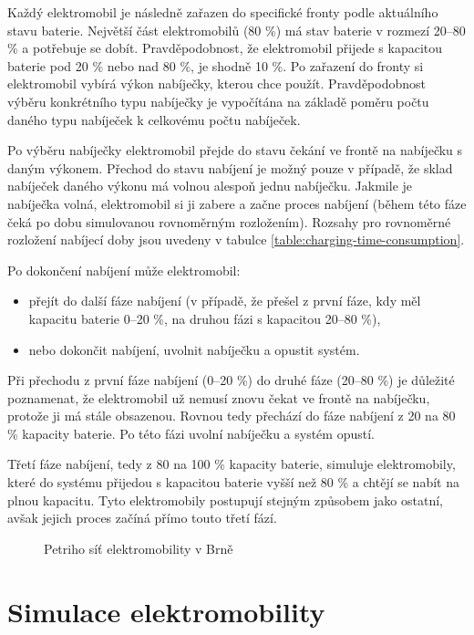 \documentclass[a4paper,11pt]{article}
\begin{document}
Každý elektromobil je následně zařazen do specifické fronty podle aktuálního stavu baterie. Největší část elektromobilů (80 \%) má stav baterie v rozmezí 20–80 \% a potřebuje se dobít. Pravděpodobnost, že elektromobil přijede s kapacitou baterie pod 20 \% nebo nad 80 \%, je shodně 10 \%. Po zařazení do fronty si elektromobil vybírá výkon nabíječky, kterou chce použít. Pravděpodobnost výběru konkrétního typu nabíječky je vypočítána na základě poměru počtu daného typu nabíječek k celkovému počtu nabíječek. 

Po výběru nabíječky elektromobil přejde do stavu čekání ve frontě na nabíječku s daným výkonem. Přechod do stavu nabíjení je možný pouze v případě, že sklad nabíječek daného výkonu má volnou alespoň jednu nabíječku. Jakmile je nabíječka volná, elektromobil si ji zabere a začne proces nabíjení (během této fáze čeká po dobu simulovanou rovnoměrným rozložením). Rozsahy pro rovnoměrné rozložení nabíjecí doby jsou uvedeny v tabulce \ref{table:charging-time-consumption}.


Po dokončení nabíjení může elektromobil:
\begin{itemize}
    \item přejít do další fáze nabíjení (v případě, že přešel z první fáze, kdy měl kapacitu baterie 0–20 \%, na druhou fázi s kapacitou 20–80 \%),
    \item nebo dokončit nabíjení, uvolnit nabíječku a opustit systém.
\end{itemize}

Při přechodu z první fáze nabíjení (0–20 \%) do druhé fáze (20–80 \%) je důležité poznamenat, že elektromobil už nemusí znovu čekat ve frontě na nabíječku, protože ji má stále obsazenou. Rovnou tedy přechází do fáze nabíjení z 20 na 80 \% kapacity baterie. Po této fázi uvolní nabíječku a systém opustí.

Třetí fáze nabíjení, tedy z 80 na 100 \% kapacity baterie, simuluje elektromobily, které do systému přijedou s kapacitou baterie vyšší než 80 \% a chtějí se nabít na plnou kapacitu. Tyto elektromobily postupují stejným způsobem jako ostatní, avšak jejich proces začíná přímo touto třetí fází.


\begin{figure}[H]
    \centering
    \scalebox{0.135}{
    }
    \caption{Petriho síť elektromobility v Brně}
    \label{figure:ims-petri-net}
\end{figure}

\section{Simulace elektromobility}
\end{document}
